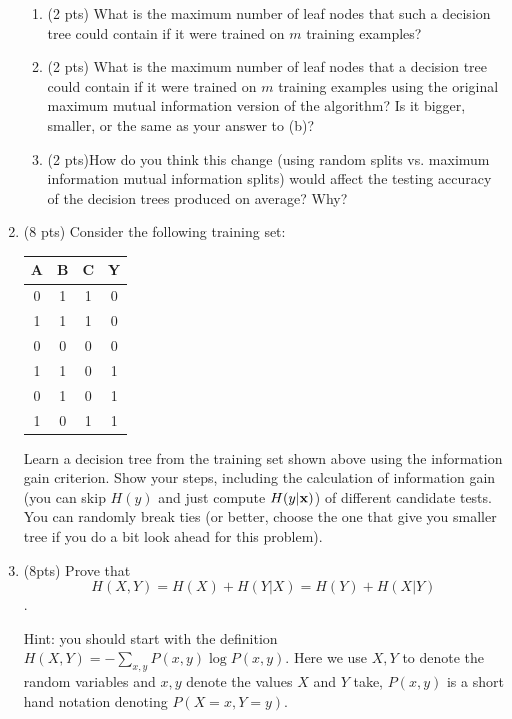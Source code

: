 \documentclass{article}
\def\x{{\bf x}}
\begin{document}
\begin{enumerate}
\begin{enumerate}
\item (2 pts) What is the maximum number of leaf nodes that such a
decision tree could contain if it were trained on $m$
training examples?


\item (2 pts) What is the maximum number of leaf nodes that a decision
tree could contain if it were trained on $m$ training
examples using the original maximum mutual information
version of the algorithm?  Is it bigger, smaller, or the
same as your answer to (b)?


\item (2 pts)How do you think this change (using random splits vs. maximum information mutual information splits) would affect the testing accuracy
of the decision trees produced on average?  Why?


\end{enumerate}
\item (8 pts) Consider the following training set:

\begin{center}
\begin{tabular}{|c|c|c|c|}\hline
A&B&C&Y\\ \hline
0&1&1&0 \\ \hline
1&1&1&0 \\ \hline
0&0&0&0 \\ \hline
1&1&0&1 \\ \hline
0&1&0&1 \\ \hline
1&0&1&1 \\ \hline
\end{tabular}
\end{center}

Learn a decision tree from the training set shown above using the information gain criterion. Show your steps, including the calculation of information gain (you can skip $H(y)$ and just compute $H(y|\x)$) of different candidate tests. You can randomly break ties (or better, choose the one that give you smaller tree if you do a bit look ahead for this problem).


\item (8pts) Prove that 
\[ H(X,Y) = H(X)+ H(Y|X) =  H(Y) + H(X|Y)\]. 

Hint: you should start with the definition $H(X,Y) = -\sum_{x,y} P(x,y) \log P(x,y)$. Here we use $X, Y$ to denote the random variables and $x,y$ denote the values $X$ and $Y$ take, $P(x,y)$ is a short hand notation denoting $P(X=x, Y=y)$. 


\end{enumerate}
\end{document}
